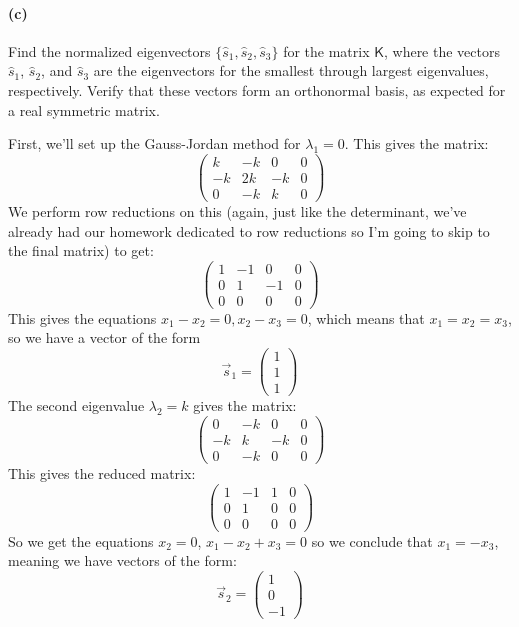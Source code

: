 \documentclass{article}
\begin{document}
\paragraph{(c)}
Find the normalized eigenvectors $\{\hat{s}_{1}, \hat{s}_{2}, \hat{s}_{3}\}$ for the matrix $\mathsf{K}$, where the vectors $\hat{s}_{1}$, $\hat{s}_{2}$, and $\hat{s}_{3}$
are the eigenvectors for the smallest through largest eigenvalues, respectively.  Verify that these vectors form an orthonormal basis, as expected for a real symmetric
matrix.

\begin{solution}
	First, we'll set up the Gauss-Jordan method for $\lambda_1 = 0$. This gives the matrix:
	\[
		\begin{pmatrix} k & -k & 0 & 0\\ -k & 2k & -k & 0 \\ 0 & -k & k & 0  \end{pmatrix} 
	\] 
	We perform row reductions on this (again, just like the determinant, we've already had our homework 
	dedicated to row reductions so I'm going to skip to the final matrix) to get:
	\[
		\begin{pmatrix} 1 & -1 & 0 & 0\\ 0 & 1 & -1 & 0\\ 0 &0&0&0 \end{pmatrix} 
	\] 
	This gives the equations $x_1 - x_2 = 0, x_2 - x_3 = 0$, which means that $x_1 = x_2 = x_3$, so we have 
	a vector of the form
	\[
	\vec s_1 = \begin{pmatrix} 1 \\1\\1 \end{pmatrix} 
	\] 
	The second eigenvalue $\lambda_2 = k$ gives the matrix:
	\[
		\begin{pmatrix} 0 & -k & 0 &0\\ -k & k&-k &0\\0 & -k &0&0 \end{pmatrix} 
	\] 
	This gives the reduced matrix:
	\[
		\begin{pmatrix} 1 &-1 & 1 & 0\\0 & 1& 0&0\\0&0&0&0 \end{pmatrix} 
	\] 
	So we get the equations $x_2 = 0$, $x_1 - x_2 + x_3 = 0$ so we conclude that $x_1 = -x_3$, meaning we 
	have vectors of the form:
	\[
	\vec s_2 = \begin{pmatrix} 1 \\0 \\ -1 \end{pmatrix} 
\]
\end{solution}
\end{document}
